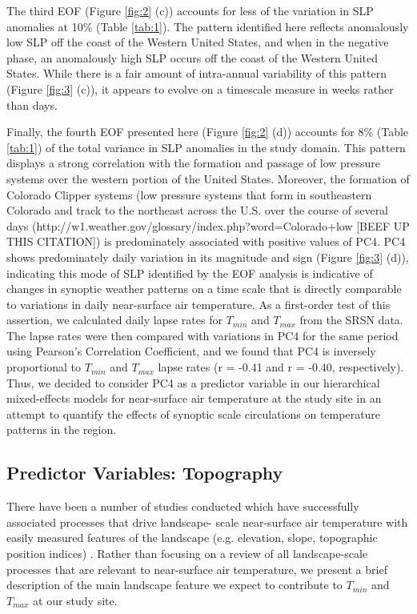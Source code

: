 \documentclass{ametsoc}
\begin{document}
The third EOF (Figure \ref{fig:2} (c)) accounts for less of the variation in SLP
anomalies at 10\% (Table \ref{tab:1}).  The pattern identified here reflects
anomalously low SLP off the coast of the Western United States, and when in the
negative phase, an anomalously high SLP occurs off the coast of the Western
United States.  While there is a fair amount of intra-annual variability of this
pattern (Figure \ref{fig:3} (c)), it appears to evolve on a timescale measure in
weeks rather than days.

Finally, the fourth EOF presented here (Figure \ref{fig:2} (d)) accounts for 8\%
(Table \ref{tab:1}) of the total variance in SLP anomalies in the study domain.
This pattern displays a strong correlation with the formation and passage of low
pressure systems over the western portion of the United States.  Moreover, the
formation of Colorado Clipper systems (low pressure systems that form in
southeastern Colorado and track to the northeast across the U.S. over the course
of several days (http://w1.weather.gov/glossary/index.php?word=Colorado+low
[BEEF UP THIS CITATION]) is predominately associated with positive values of
PC4.  PC4 shows predominately daily variation in its magnitude and sign (Figure
\ref{fig:3} (d)), indicating this mode of SLP identified by the EOF analysis is
indicative of changes in synoptic weather patterns on a time scale that is
directly comparable to variations in daily near-surface air temperature.  As a
first-order test of this assertion, we calculated daily lapse rates for
$T_{min}$ and $T_{max}$ from the SRSN data.  The lapse rates were then compared
with variations in PC4 for the same period using Pearson's Correlation
Coefficient, and we found that PC4 is inversely proportional to $T_{min}$ and
$T_{max}$ lapse rates (r = -0.41 and r = -0.40, respectively).  Thus, we decided to
consider PC4 as a predictor variable in our hierarchical mixed-effects models
for near-surface air temperature at the study site in an attempt to quantify the
effects of synoptic scale circulations on temperature patterns in the region.

\subsection{Predictor Variables: Topography} 
There have been a number of studies
conducted which have successfully associated processes that drive landscape-
scale near-surface air temperature with easily measured features of the
landscape (e.g. elevation, slope, topographic position indices)
\citep{Fridley2009,Dobrowski2009,Ashcroft2011}.  Rather than focusing on a
review of all landscape-scale processes that are relevant to near-surface air
temperature, we present a brief description of the main landscape feature we
expect to contribute to $T_{min}$ and $T_{max}$ at our study site.
\end{document}

